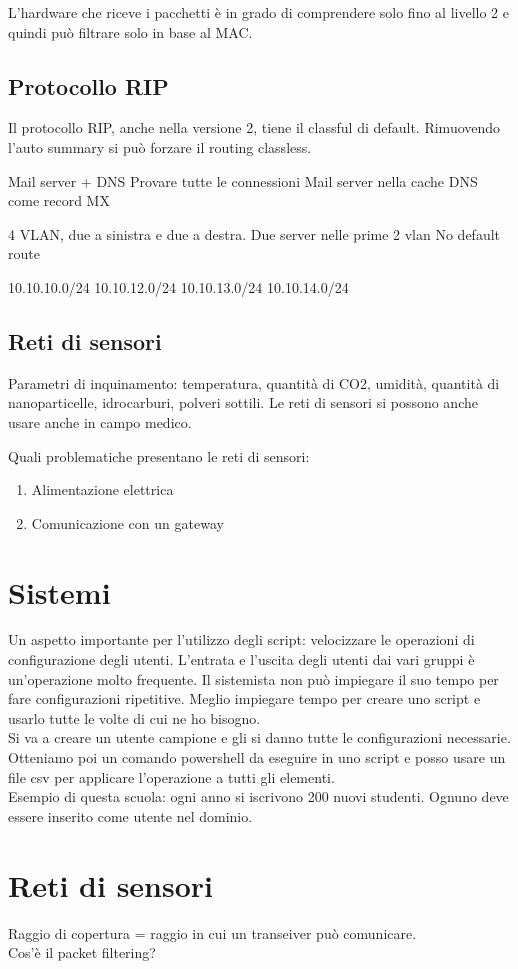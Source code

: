 \documentclass{article}
\begin{document}
    L'hardware che riceve i pacchetti è in grado di comprendere solo fino al livello 2 e quindi può filtrare solo in base al MAC.

    \subsection{Protocollo RIP}
    Il protocollo RIP, anche nella versione 2, tiene il classful di default.
    Rimuovendo l'auto summary si può forzare il routing classless.

    Mail server + DNS
    Provare tutte le connessioni
    Mail server nella cache DNS come record MX

    4 VLAN, due a sinistra e due a destra.
    Due server nelle prime 2 vlan
    No default route

    10.10.10.0/24
    10.10.12.0/24
    10.10.13.0/24
    10.10.14.0/24

    \subsection{Reti di sensori}
    Parametri di inquinamento: temperatura, quantità di CO2, umidità, quantità di nanoparticelle, idrocarburi, polveri sottili.
    Le reti di sensori si possono anche usare anche in campo medico.

    Quali problematiche presentano le reti di sensori:
    \begin{enumerate}
        \item Alimentazione elettrica
        \item Comunicazione con un gateway
    \end{enumerate}

    \section{Sistemi}
    Un aspetto importante per l'utilizzo degli script: velocizzare le operazioni di configurazione degli utenti.
    L'entrata e l'uscita degli utenti dai vari gruppi è un'operazione molto frequente.
    Il sistemista non può impiegare il suo tempo per fare configurazioni ripetitive.
    Meglio impiegare tempo per creare uno script e usarlo tutte le volte di cui ne ho bisogno.
    \\
    Si va a creare un utente campione e gli si danno tutte le configurazioni necessarie. Otteniamo poi un comando
    powershell da eseguire in uno script e posso usare un file csv per applicare l'operazione a tutti gli elementi.
    \\
    Esempio di questa scuola: ogni anno si iscrivono 200 nuovi studenti. Ognuno deve essere inserito come utente nel dominio.

    \section{Reti di sensori}
    Raggio di copertura = raggio in cui un transeiver può comunicare.
    \\
    Cos'è il packet filtering?
    
\end{document}
